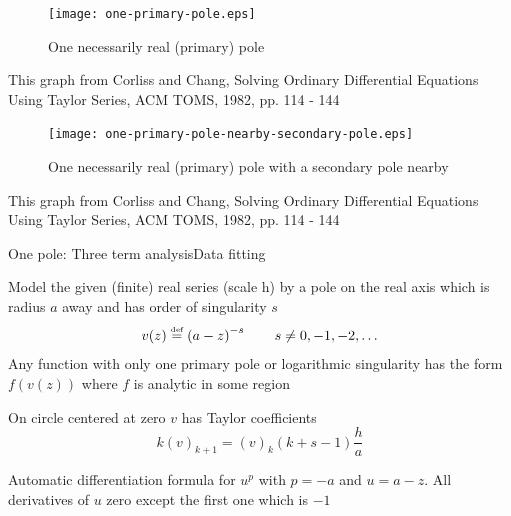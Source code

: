 \documentclass[11pt,svgnames,fleqn]{beamer}
\newcommand{\defeq}{\stackrel{\textup{\tiny def}}{=}}
\newcommand{\parbg}[1]{\left(  {#1} \right)}
\newcommand{\DM}[1]{\begin{displaymath} {#1} \end{displaymath}}
\newcommand{\tc}[2]{(#1)_{#2}}
\begin{document}
  
\begin{frame}

\begin{figure}
  \centering
  \vspace{-0.4cm}
  \texttt{[image: one-primary-pole.eps]} %
  \caption{One necessarily real (primary) pole}
\end{figure}

  {\footnotesize This graph from Corliss and Chang, Solving Ordinary Differential Equations 
  Using Taylor Series, ACM TOMS, 1982, pp. 114 - 144}
\end{frame}

\begin{frame}

\begin{figure}
  \centering
  \vspace{-0.4cm}
  \texttt{[image: one-primary-pole-nearby-secondary-pole.eps]} %
  \caption{One necessarily real (primary) pole with a secondary pole nearby}
\end{figure}

  {\footnotesize This graph from Corliss and Chang, Solving Ordinary Differential Equations 
  Using Taylor Series, ACM TOMS, 1982, pp. 114 - 144}
\end{frame}

\begin{frame}{One pole: Three term analysis}{Data fitting}

  Model the given (finite) real series (scale h) by a pole on the real axis which is radius $a$ away
  and has order of singularity $s$
  \DM
  {
    v(z) \defeq \parbg{a-z}^{-s}  \qquad s \neq 0, -1, -2, \ldots
  }
  Any function with only one primary pole or logarithmic singularity
  has the form $f(v(z))$ where $f$ is analytic in some region

  \vspace{2mm}

  On circle centered at zero $v$ has Taylor coefficients 
  \DM
  {
    k \tc{v}{k+1} = \tc{v}{k}\parbg{k+s-1}\frac{h}{a}
  }
 
  Automatic differentiation formula for $u^p$ with $p=-a$ and $u=a-z$. All derivatives of $u$ zero
  except the first one which is $-1$
\end{frame}
\end{document}
